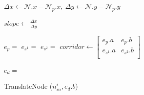 \begin{algorithm}[tb!]
\begin{algorithmic}[1]
            \State $ \Delta x \gets \mathcal{N}.x - \mathcal{N}_{p}.x,~ \Delta y \gets \mathcal{N}.y - \mathcal{N}_{p}.y $

            \State $ slope \gets \frac{\Delta x}{\Delta y}$

            \State $ e_{p} = $ 
            \State $ e_{s^1} = $ 
            \State $ e_{s^2} = $ 
            \State $ corridor \gets
                \begin{bmatrix}
                    e_{p}.a &
                    e_{p}.b \\

                    e_{s^1}.a &
                    e_{s^2}.b \\
                \end{bmatrix} $

                \State $ e_{d} = $ 

                \State TranslateNode ($ {n}_{in}^i, e_{d}.b $)
            \EndFor
        \EndProcedure
    \end{algorithmic}
\end{algorithm}



